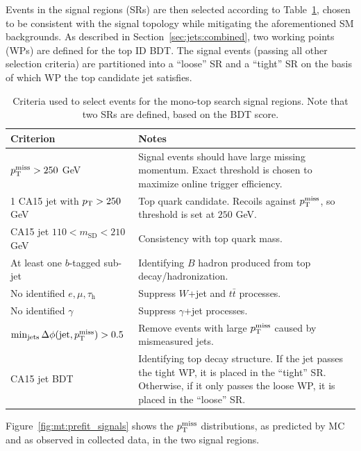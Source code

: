 Events in the signal regions (SRs) are then selected according to Table~\ref{tab:mt:cuts}, chosen to be consistent with the signal topology while mitigating the aforementioned SM backgrounds.
As described in Section~\ref{sec:jets:combined}, two working points (WPs) are defined for the top ID BDT.
The signal events (passing all other selection criteria) are partitioned into a ``loose'' SR and a ``tight'' SR on the basis of which WP the top candidate jet satisfies. 

\begin{table}[!ht]
    \caption{Criteria used to select events for the mono-top search signal regions. Note that two SRs are defined, based on the BDT score.}
    \label{tab:mt:cuts}
    \begin{tabular}{p{}p{}}
        Criterion & Notes \\ 
        \hline 
        \hline 
        $p_\mathrm{T}^\mathrm{miss}>250$ GeV & Signal events should have large missing momentum. Exact threshold is chosen to maximize online trigger efficiency. \\ 
        1 CA15 jet with $p_\mathrm{T}>250$ GeV & Top quark candidate. Recoils against $p_\mathrm{T}^\mathrm{miss}$, so threshold is set at $250$ GeV. \\ 
        CA15 jet $110 < m_\mathrm{SD} < 210$ GeV & Consistency with top quark mass. \\ 
        At least one $b$-tagged sub-jet & Identifying $B$ hadron produced from top decay/hadronization. \\ 
        \hline 
        No identified $e,\mu,\tau_\mathrm{h}$ & Suppress $W$+jet and $t\bar{t}$ processes. \\ 
        No identified $\gamma$ & Suppress $\gamma$+jet processes. \\ 
        \hline 
        $\min_\mathrm{jets}\Delta\phi(\mathrm{jet},p_\mathrm{T}^\mathrm{miss}) > 0.5$ & Remove events with large $p_\mathrm{T}^\mathrm{miss}$ caused by mismeasured jets. \\ 
        \hline 
        CA15 jet BDT & Identifying top decay structure. If the jet passes the tight WP, it is placed in the ``tight'' SR. Otherwise, if it only passes the loose WP, it is placed in the ``loose'' SR.\\ 
    \end{tabular}
\end{table}

Figure~\ref{fig:mt:prefit_signals} shows the $p_\mathrm{T}^\mathrm{miss}$ distributions, as predicted by MC and as observed in collected data, in the two signal regions.

